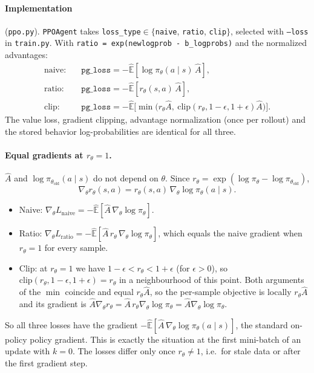 \documentclass[11pt]{article}
\newcommand{\piold}{\pi_{\theta_{\mathrm{old}}}}
\newcommand{\Ahat}{\hat{A}}
\newcommand{\Ehat}{\hat{\mathbb{E}}}
\newcommand{\code}[1]{\texttt{#1}}
\begin{document}
\paragraph{Implementation} (\code{ppo.py}). \code{PPOAgent} takes \code{loss\_type}$\in\{$\code{naive},
\code{ratio}, \code{clip}$\}$, selected with \code{--loss} in \code{train.py}. With
\code{ratio = exp(newlogprob - b\_logprobs)} and the normalized advantages:
\begin{align*}
  \text{naive:} & \quad \code{pg\_loss} = -\Ehat[\log\pi_\theta(a\mid s)\,\Ahat],                                                           \\
  \text{ratio:} & \quad \code{pg\_loss} = -\Ehat[r_\theta(s,a)\,\Ahat],                                                                     \\
  \text{clip:}  & \quad \code{pg\_loss} = -\Ehat\big[\min\big(r_\theta\Ahat,\ \mathrm{clip}(r_\theta,1-\epsilon,1+\epsilon)\Ahat\big)\big].
\end{align*}
The value loss, gradient clipping, advantage normalization (once per rollout) and the stored behavior
log-probabilities are identical for all three.

\paragraph{Equal gradients at $r_\theta=1$.}
$\Ahat$ and $\log\piold(a\mid s)$ do not depend on $\theta$. Since
$r_\theta=\exp(\log\pi_\theta-\log\piold)$,
\[
  \nabla_\theta r_\theta(s,a) = r_\theta(s,a)\,\nabla_\theta\log\pi_\theta(a\mid s).
\]
\begin{itemize}[leftmargin=*]
  \item Naive: $\nabla_\theta L_{\text{naive}} = -\Ehat[\Ahat\,\nabla_\theta\log\pi_\theta]$.
  \item Ratio: $\nabla_\theta L_{\text{ratio}} = -\Ehat[\Ahat\,r_\theta\,\nabla_\theta\log\pi_\theta]$, which equals the naive
        gradient when $r_\theta=1$ for every sample.
  \item Clip: at $r_\theta=1$ we have $1-\epsilon<r_\theta<1+\epsilon$ (for $\epsilon>0$), so
        $\mathrm{clip}(r_\theta,1-\epsilon,1+\epsilon)=r_\theta$ in a neighbourhood of this point. Both arguments of
        the $\min$ coincide and equal $r_\theta\Ahat$, so the per-sample objective is locally $r_\theta\Ahat$
        and its gradient is $\Ahat\nabla_\theta r_\theta=\Ahat\,r_\theta\nabla_\theta\log\pi_\theta=\Ahat\nabla_\theta\log\pi_\theta$.
\end{itemize}
So all three losses have the gradient $-\Ehat[\Ahat\,\nabla_\theta\log\pi_\theta(a\mid s)]$, the
standard on-policy policy gradient. This is exactly the situation at the first mini-batch of an update with
$k=0$. The losses differ only once $r_\theta\neq1$, i.e.\ for stale data or after the first gradient step.
\end{document}
